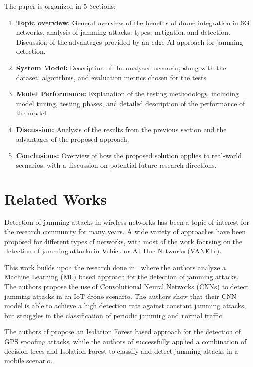 \documentclass[futureinternet,article,submit,pdftex,moreauthors]{Definitions/mdpi}
\begin{document}
The paper is organized in 5 Sections: 
\begin{enumerate}
	\item \textbf{Topic overview:} General overview of the benefits of drone integration in 6G networks, analysis of jamming attacks: types, mitigation and detection. Discussion of the advantages provided by an edge AI approach for jamming detection. 
	\item \textbf{System Model:} Description of the analyzed scenario, along with the dataset, algorithms, and evaluation metrics chosen for the tests.
	\item \textbf{Model Performance:} Explanation of the testing methodology, including model tuning, testing phases, and detailed description of the performance of the model.
	\item \textbf{Discussion:} Analysis of the results from the previous section and the advantages of the proposed approach.
	\item \textbf{Conclusions:} Overview of how the proposed solution applies to real-world scenarios, with a discussion on potential future research directions.
\end{enumerate}

\section{Related Works}

Detection of jamming attacks in wireless networks has been a topic of interest for the research community for many years. A wide variety of approaches have been proposed for different types of networks, with most of the work focusing on the detection of jamming attacks in Vehicular Ad-Hoc Networks (VANETs)\cite{VANETsAI-Lyamin}.

This work builds upon the research done in \cite{JammingDetectionIoT-Hussain}, where the authors analyze a Machine Learning (ML) based approach for the detection of jamming attacks. 
The authors propose the use of Convolutional Neural Networks (CNNs) to detect jamming attacks in an IoT drone scenario. The authors \cite{JammingDetectionIoT-Hussain} show that their CNN model is able to achieve a high detection rate against constant jamming attacks, but
struggles in the classification of periodic jamming and normal traffic. 

The authors of \cite{GPSSpoofingDetection-Zuo} propose an Isolation Forest based approach for the detection of GPS spoofing attacks, while the authors of \cite{HybridJammingDetection-Hong} successfully applied a combination of decision trees and Isolation Forest to classify 
and detect jamming attacks in a mobile scenario. 
\end{document}
